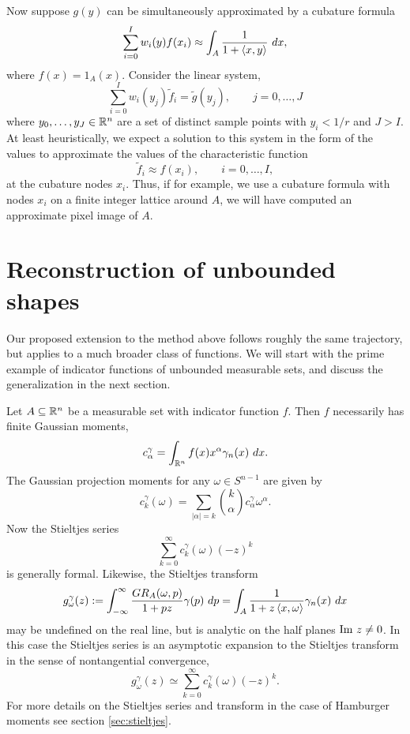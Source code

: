 Now suppose $g(y)$ can be simultaneously approximated by a cubature formula
\[
  \sum_{i = 0}^I w_i(y) f(x_i) \approx \int_{A} \frac1{1 + \left\langle x, y \right\rangle}~dx,
\]
where $f(x) = 1_A(x)$. Consider the linear system,
\[
  \sum_{i = 0}^I w_i(y_j) \tilde f_i = \tilde g(y_j), \qquad j = 0, \ldots, J
\]
where $y_0, \ldots, y_J \in \mathbb{R}^n$ are a set of distinct sample points with $y_i < 1/r$ and $J > I$. At least heuristically, we expect a solution to this system in the form of the values to approximate the values of the characteristic function
\[
  \tilde f_i \approx f(x_i), \qquad i = 0, \ldots, I,
\]
at the cubature nodes $x_i$. Thus, if for example, we use a cubature formula with nodes $x_i$ on a finite integer lattice around $A$, we will have computed an approximate pixel image of $A$.


\section{Reconstruction of unbounded shapes}

Our proposed extension to the method above follows roughly the same trajectory, but applies to a much broader class of functions. We will start with the prime example of indicator functions of unbounded measurable sets, and discuss the generalization in the next section.

Let $A \subseteq \mathbb{R}^n$ be a measurable set with indicator function $f$. Then $f$ necessarily has finite Gaussian moments,
\[
  c^\gamma_\alpha = \int_{\mathbb{R}^n} f(x) x^\alpha \gamma_n(x) ~dx.
\]
The Gaussian projection moments for any $\omega \in S^{n-1}$ are given by
\[
  c^\gamma_k(\omega) = \sum_{|\alpha| = k} \binom{k}{\alpha} c^\gamma_\alpha \omega^\alpha.
\]
Now the Stieltjes series
\[
  \sum_{k = 0}^\infty c^\gamma_k(\omega) (-z)^k
\]
is generally formal. Likewise, the Stieltjes transform
\[
  g^\gamma_\omega(z) := \int_{-\infty}^\infty \frac{GR_A(\omega, p)}{1 + pz} \gamma(p)~dp = \int_A \frac{1}{1 + z\left\langle x, \omega \right\rangle} \gamma_n(x) ~dx
\]
may be undefined on the real line, but is analytic on the half planes $\text{Im}~ z \neq 0$. In this case the Stieltjes series is an asymptotic expansion to the Stieltjes transform in the sense of nontangential convergence,
\[
  g^\gamma_\omega(z) \simeq \sum_{k = 0}^\infty c^\gamma_k(\omega) (-z)^k.
\]
For more details on the Stieltjes series and transform in the case of Hamburger moments see section \ref{sec:stieltjes}. 

